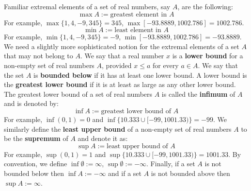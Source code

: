 Familiar extremal elements of a set of real numbers, say $A$, are the following:
\[
\boxed{
\max{A} := \text{greatest element in $A$}
}
\]
For example, $\max \{1,4,-9,345\} = 345$, $\max [-93.8889,1002.786] = 1002.786$.
\[
\boxed{
\min{A} := \text{least element in $A$}
}
\]
For example, $\min \{1,4,-9,345\} = -9$, $\min [-93.8889,1002.786] = -93.8889$.  We need a slightly more sophisticated notion for the extremal elements of a set $A$ that may not belong to $A$.  We say that a real number $x$ is a {\bf lower bound} for a non-empty set of real numbers $A$, provided $x \leq a$ for every $a \in A$.  We say that the set $A$ is {\bf bounded below} if it has at least one lower bound.  A lower bound is the {\bf greatest lower bound} if it is at least as large as any other lower bound.  The greatest lower bound of a set of real numbers $A$ is called the {\bf infimum} of $A$ and is denoted by:
\[
\boxed{
\inf{A} := \text{greatest lower bound of $A$}
}
\]
For example, $\inf (0,1) = 0$ and $\inf \{ 10.333 \cup [-99,1001.33) \} = -99$.  We similarly define the {\bf least upper bound} of a non-empty set of real numbers $A$ to be the {\bf supremum} of $A$ and denote it as:
\[
\boxed{
\sup{A} := \text{least upper bound of $A$}
}
\]
For example, $\sup (0,1) = 1$ and $\sup \{ 10.333 \cup [-99,1001.33) \} = 1001.33$.  By convention, we define $\inf \emptyset := \infty$, $\sup \emptyset := - \infty$.  Finally, if a set $A$ is not bounded below then $\inf A := - \infty$ and if a set $A$ is not bounded above then $\sup A := \infty$.
